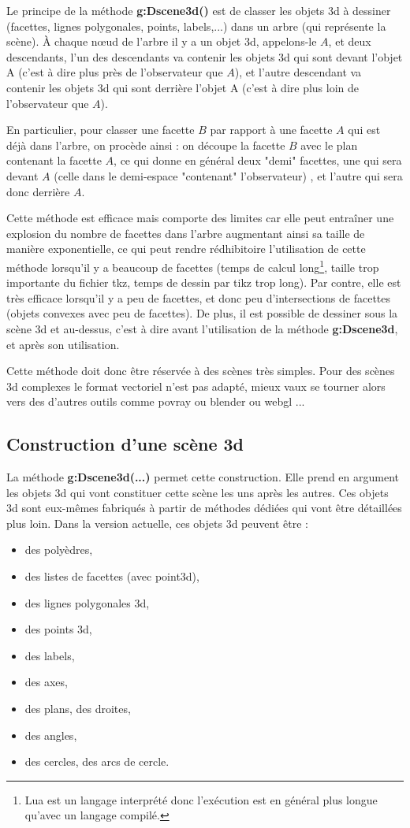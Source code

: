 Le principe de la méthode \textbf{g:Dscene3d()} est de classer les objets 3d à dessiner (facettes, lignes polygonales, points, labels,...) dans un arbre (qui représente la scène). À chaque n{\oe}ud de l'arbre il y a un objet 3d, appelons-le $A$, et deux descendants, l'un des descendants va contenir les objets 3d qui sont devant l'objet A (c'est à dire plus près de l'observateur que $A$), et l'autre descendant va contenir les objets 3d qui sont derrière l'objet A (c'est à dire plus loin de l'observateur que $A$).

En particulier, pour classer une facette $B$ par rapport à une facette $A$ qui est déjà dans l'arbre, on procède ainsi : on découpe la facette $B$ avec le plan contenant la facette $A$, ce qui donne en général deux "demi" facettes, une qui sera devant $A$ (celle dans le demi-espace "contenant" l'observateur) , et l'autre qui sera donc derrière $A$.

Cette méthode est efficace mais comporte des limites car elle peut entraîner une explosion du nombre de facettes dans l'arbre augmentant ainsi sa taille de manière exponentielle, ce qui peut rendre rédhibitoire l'utilisation de cette méthode lorsqu'il y a beaucoup de facettes (temps de calcul long\footnote{Lua est un langage interprété donc l'exécution est en général plus longue qu'avec un langage compilé.}, taille trop importante du fichier tkz, temps de dessin par tikz trop long). Par contre, elle est très efficace lorsqu'il y a peu de facettes, et donc peu d'intersections de facettes (objets convexes avec peu de facettes). De plus, il est possible de dessiner sous la scène 3d et au-dessus, c'est à dire avant l'utilisation de la méthode \textbf{g:Dscene3d}, et après son utilisation.

Cette méthode doit donc être réservée à des scènes très simples. Pour des scènes 3d complexes le format vectoriel n'est pas adapté, mieux vaux se tourner alors vers des d'autres outils comme povray ou blender ou webgl ...

\subsection{Construction d'une scène 3d}

La méthode \textbf{g:Dscene3d(...)} permet cette construction. Elle prend en argument les objets 3d qui vont constituer cette scène les uns après les autres. Ces objets 3d sont eux-mêmes fabriqués à partir de méthodes dédiées qui vont être détaillées plus loin. Dans la version actuelle, ces objets 3d peuvent être :
\begin{itemize}
    \item des polyèdres, 
    \item des listes de facettes (avec point3d),
    \item des lignes polygonales 3d,
    \item des points 3d,
    \item des labels,
    \item des axes,
    \item des plans, des droites,
    \item des angles,
    \item des cercles, des arcs de cercle.
\end{itemize}

